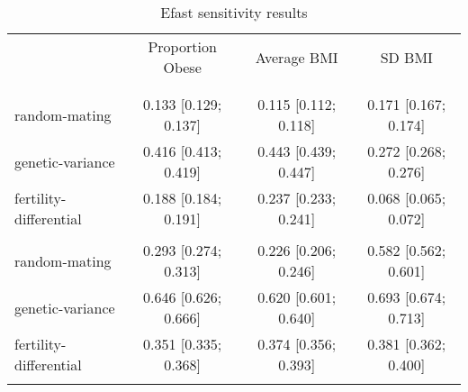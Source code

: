 
\begin{table}[htp]
\caption{Efast sensitivity results}
\label{tab:sensitivity}
\footnotesize
\centering
\begin{tabular}{lccc}
\hline
\addlinespace
& Proportion Obese & Average BMI & SD BMI \\
\addlinespace
\hline
\addlinespace
\multicolumn{4}{l}{\textbf{Scenario 1}} \\
\addlinespace[6pt]
\multicolumn{4}{l}{\hspace{1em} S1} \\
\hspace{1.5em} random-mating & 0.133 [0.129; 0.137] & 0.115 [0.112; 0.118] & 0.171 [0.167; 0.174]\\ 
	\hspace{1.5em} genetic-variance & 0.416 [0.413; 0.419] & 0.443 [0.439; 0.447] & 0.272 [0.268; 0.276]\\ 
	\hspace{1.5em} fertility-differential & 0.188 [0.184; 0.191] & 0.237 [0.233; 0.241] & 0.068 [0.065; 0.072]\\
\addlinespace[12pt]
\multicolumn{4}{l}{\hspace{1em} ST} \\ 
\hspace{1.5em} random-mating & 0.293 [0.274; 0.313] & 0.226 [0.206; 0.246] & 0.582 [0.562; 0.601]\\ 
	\hspace{1.5em} genetic-variance & 0.646 [0.626; 0.666] & 0.620 [0.601; 0.640] & 0.693 [0.674; 0.713]\\ 
	\hspace{1.5em} fertility-differential & 0.351 [0.335; 0.368] & 0.374 [0.356; 0.393] & 0.381 [0.362; 0.400]\\ 
\addlinespace
\hline
\end{tabular}
\end{table}
